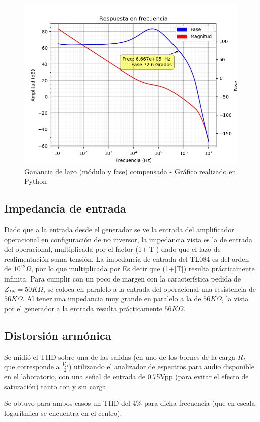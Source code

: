 \begin{figure}[!ht]
\begin{centering}
\includegraphics[scale=0.6]{Imagenes/LazoCompenzar.png}
\par\end{centering}
\caption{Ganancia de lazo (módulo y fase) compensada - Gráfico realizado en Python}
\end{figure}

\subsection{Impedancia de entrada}

Dado que a la entrada desde el generador se ve la entrada del amplificador operacional en configuración de no inversor, la impedancia vista es la de entrada del operacional, multiplicada por el factor (1+|T|) dado que el lazo de realimentación suma tensión. La impedancia de entrada del TL084 es del orden de $10^{12}\Omega$, por lo que multiplicada por Es decir que (1+|T|) resulta prácticamente infinita. Para cumplir con un poco de margen con la característica pedida de $Z_{IN} = 50K\Omega$, se coloca en paralelo a la entrada del operacional una resistencia de $56K\Omega$. Al tener una impedancia muy grande en paralelo a la de $56K\Omega$, la vista por el generador a la entrada resulta prácticamente $56K\Omega$.

\subsection{Distorsión armónica}

Se midió el THD sobre una de las salidas (en uno de los bornes de la carga $R_L$ que corresponde a $\frac{V_O}{2}$) utilizando el analizador de espectros para audio disponible en el laboratorio, con una señal de entrada de 0.75Vpp (para evitar el efecto de saturación) tanto con y sin carga.\par
Se obtuvo para ambos casos un THD del 4$\%$ para dicha frecuencia (que en escala logarítmica se encuentra en el centro).



